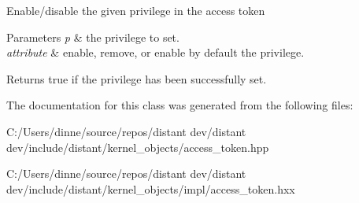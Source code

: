 Enable/disable the given privilege in the access token 
\begin{DoxyParams}{Parameters}
{\em p} & the privilege to set. \\
\hline
{\em attribute} & enable, remove, or enable by default the privilege. \\
\hline
\end{DoxyParams}
\begin{DoxyReturn}{Returns}
true if the privilege has been successfully set. 
\end{DoxyReturn}


The documentation for this class was generated from the following files\+:\begin{DoxyCompactItemize}
\item 
C\+:/\+Users/dinne/source/repos/distant dev/distant dev/include/distant/kernel\+\_\+objects/access\+\_\+token.\+hpp\item 
C\+:/\+Users/dinne/source/repos/distant dev/distant dev/include/distant/kernel\+\_\+objects/impl/access\+\_\+token.\+hxx\end{DoxyCompactItemize}
